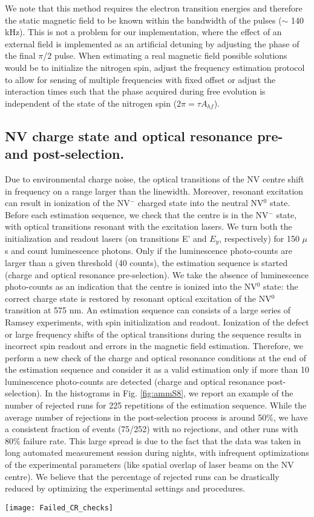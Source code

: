 We note that this method requires the electron transition energies and therefore the static magnetic field to be known within the bandwidth of the pulses ($\sim$ 140 kHz). This is not a problem for our implementation, where the effect of an external field is implemented as an artificial detuning by adjusting the phase of the final $\pi$/2 pulse. When estimating a real magnetic field possible solutions would be to initialize the nitrogen spin, adjust the frequency estimation protocol to allow for sensing of multiple frequencies with fixed offset or adjust the interaction times such that the phase acquired during free evolution is independent of the state of the nitrogen spin ($2 \pi = \tau A_{hf}$).

\subsection{NV charge state and optical resonance pre- and post-selection.}
Due to environmental charge noise, the optical transitions of the NV centre shift in frequency on a range larger than the linewidth. Moreover, resonant excitation can result in ionization of the NV$^-$ charged state into the neutral NV$^0$ state.
Before each estimation sequence, we check that the centre is in the NV$^-$ state, with optical transitions resonant with the excitation lasers. We turn both the initialization and readout lasers (on transitions E’ and $E_y$, respectively) for 150 $\mu$s and count luminescence photons. Only if the luminescence photo-counts are larger than a given threshold (40 counts), the estimation sequence is started (charge and optical resonance pre-selection). We take the absence of luminescence photo-counts as an indication that the centre is ionized into the NV$^0$ state: the correct charge state is restored by resonant optical excitation of the NV$^0$ transition at 575 nm.
An estimation sequence can consists of a large series of Ramsey experiments, with spin initialization and readout. Ionization of the defect or large frequency shifts of the optical transitions during the sequence results in incorrect spin readout and errors in the magnetic field estimation. Therefore, we perform a new check of the charge and optical resonance conditions at the end of the estimation sequence and consider it as a valid estimation only if more than 10 luminescence photo-counts are detected (charge and optical resonance post-selection).
In the histograms in Fig. \ref{fig:ammS8}, we report an example of the number of rejected runs for 225 repetitions of the estimation sequence. While the average number of rejections in the post-selection process is around 50\%, we have a consistent fraction of events (75/252) with no rejections, and other runs with 80\% failure rate. This large spread is due to the fact that the data was taken in long automated measurement session during nights, with infrequent optimizations of the experimental parameters (like spatial overlap of laser beams on the NV centre). We believe that the percentage of rejected runs can be drastically reduced by optimizing the experimental settings and procedures.
\begin{figure*}
	\centering
	\texttt{[image: Failed\_CR\_checks]}
	\caption{\label{fig:ammS8} \textbf{Charge resonance statistics.} Histograms of the percentage of rejected runs in charge and optical resonance post-selection.}
\end{figure*}


